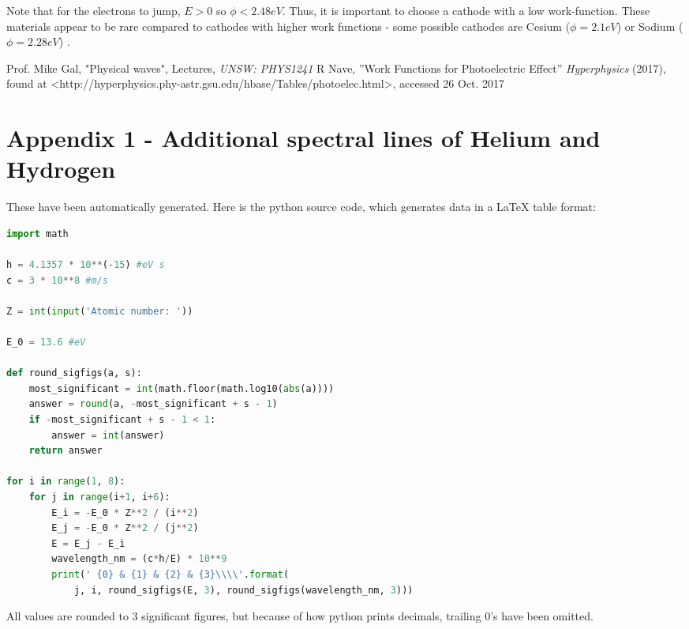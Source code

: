 \documentclass[paper=a4, fontsize=12pt]{scrartcl}
\begin{document}
Note that for the electrons to jump, $E > 0$ so $\phi < 2.48 eV$. Thus, it is important to choose a cathode with a low work-function. These materials appear to be rare compared to cathodes with higher work functions - some possible cathodes are Cesium ($\phi = 2.1 eV$) or Sodium ($\phi = 2.28 eV$) \cite{Workfunctions}.

\clearpage

\begin{thebibliography}{99}
 Prof. Mike Gal, "Physical waves", Lectures, {\em UNSW: PHYS1241}
 R Nave, ''Work Functions for Photoelectric Effect'' {\em Hyperphysics} (2017), found at <http://hyperphysics.phy-astr.gsu.edu/hbase/Tables/photoelec.html>, accessed 26 Oct. 2017

\end{thebibliography}

\section{Appendix 1 - Additional spectral lines of Helium and Hydrogen}

These have been automatically generated. Here is the python source code, which generates data in a LaTeX table format:

\begin{lstlisting}[language=Python]
import math

h = 4.1357 * 10**(-15) #eV s
c = 3 * 10**8 #m/s

Z = int(input('Atomic number: '))

E_0 = 13.6 #eV

def round_sigfigs(a, s):
    most_significant = int(math.floor(math.log10(abs(a))))
    answer = round(a, -most_significant + s - 1)
    if -most_significant + s - 1 < 1:
        answer = int(answer)
    return answer

for i in range(1, 8):
    for j in range(i+1, i+6):
        E_i = -E_0 * Z**2 / (i**2)
        E_j = -E_0 * Z**2 / (j**2)
        E = E_j - E_i
        wavelength_nm = (c*h/E) * 10**9
        print(' {0} & {1} & {2} & {3}\\\\'.format(
            j, i, round_sigfigs(E, 3), round_sigfigs(wavelength_nm, 3)))

\end{lstlisting}

All values are rounded to 3 significant figures, but because of how python prints decimals, trailing 0's have been omitted.
\end{document}
